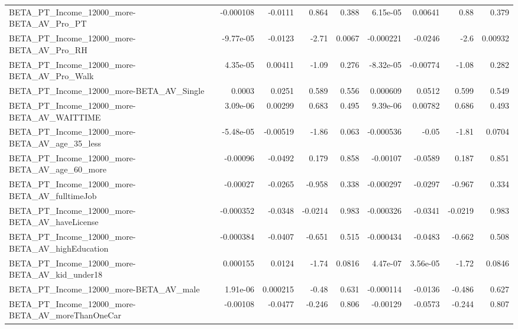 \begin{tabular}{lrrrrrrrr}
BETA\_PT\_Income\_12000\_more-BETA\_AV\_Pro\_PT           &   -0.000108 &      -0.0111 &    0.864 &    0.388 &   6.15e-05 &     0.00641 &         0.88 &         0.379 \\
BETA\_PT\_Income\_12000\_more-BETA\_AV\_Pro\_RH           &   -9.77e-05 &      -0.0123 &    -2.71 &   0.0067 &  -0.000221 &     -0.0246 &         -2.6 &       0.00932 \\
BETA\_PT\_Income\_12000\_more-BETA\_AV\_Pro\_Walk         &    4.35e-05 &      0.00411 &    -1.09 &    0.276 &  -8.32e-05 &    -0.00774 &        -1.08 &         0.282 \\
BETA\_PT\_Income\_12000\_more-BETA\_AV\_Single           &      0.0003 &       0.0251 &    0.589 &    0.556 &   0.000609 &      0.0512 &        0.599 &         0.549 \\
BETA\_PT\_Income\_12000\_more-BETA\_AV\_WAITTIME         &    3.09e-06 &      0.00299 &    0.683 &    0.495 &   9.39e-06 &     0.00782 &        0.686 &         0.493 \\
BETA\_PT\_Income\_12000\_more-BETA\_AV\_age\_35\_less      &   -5.48e-05 &     -0.00519 &    -1.86 &    0.063 &  -0.000536 &       -0.05 &        -1.81 &        0.0704 \\
BETA\_PT\_Income\_12000\_more-BETA\_AV\_age\_60\_more      &    -0.00096 &      -0.0492 &    0.179 &    0.858 &   -0.00107 &     -0.0589 &        0.187 &         0.851 \\
BETA\_PT\_Income\_12000\_more-BETA\_AV\_fulltimeJob      &    -0.00027 &      -0.0265 &   -0.958 &    0.338 &  -0.000297 &     -0.0297 &       -0.967 &         0.334 \\
BETA\_PT\_Income\_12000\_more-BETA\_AV\_haveLicense      &   -0.000352 &      -0.0348 &  -0.0214 &    0.983 &  -0.000326 &     -0.0341 &      -0.0219 &         0.983 \\
BETA\_PT\_Income\_12000\_more-BETA\_AV\_highEducation    &   -0.000384 &      -0.0407 &   -0.651 &    0.515 &  -0.000434 &     -0.0483 &       -0.662 &         0.508 \\
BETA\_PT\_Income\_12000\_more-BETA\_AV\_kid\_under18      &    0.000155 &       0.0124 &    -1.74 &   0.0816 &   4.47e-07 &    3.56e-05 &        -1.72 &        0.0846 \\
BETA\_PT\_Income\_12000\_more-BETA\_AV\_male             &    1.91e-06 &     0.000215 &    -0.48 &    0.631 &  -0.000114 &     -0.0136 &       -0.486 &         0.627 \\
BETA\_PT\_Income\_12000\_more-BETA\_AV\_moreThanOneCar   &    -0.00108 &      -0.0477 &   -0.246 &    0.806 &   -0.00129 &     -0.0573 &       -0.244 &         0.807 \\

\end{tabular}
